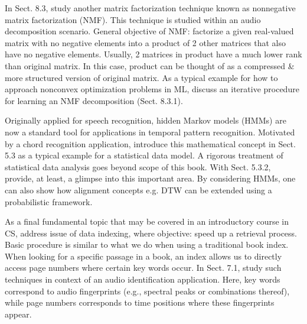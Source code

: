 \documentclass{article}
\begin{document}
\begin{itemize}
\begin{itemize}
		In Sect. 8.3, study another matrix factorization technique known as nonnegative matrix factorization (NMF). This technique is studied within an audio decomposition scenario. General objective of NMF: factorize a given real-valued matrix with no negative elements into a product of 2 other matrices that also have no negative elements. Usually, 2 matrices in product have a much lower rank than original matrix. In this case, product can be thought of as a compressed \& more structured version of original matrix. As a typical example for how to approach nonconvex optimization problems in ML, discuss an iterative procedure for learning an NMF decomposition (Sect. 8.3.1).
		
		Originally applied for speech recognition, hidden Markov models (HMMs) are now a standard tool for applications in temporal pattern recognition. Motivated by a chord recognition application, introduce this mathematical concept in Sect. 5.3 as a typical example for a statistical data model. A rigorous treatment of statistical data analysis goes beyond scope of this book. With Sect. 5.3.2, provide, at least, a glimpse into this important area. By considering HMMs, one can also show how alignment concepts e.g. DTW can be extended using a probabilistic framework.
		
		As a final fundamental topic that may be covered in an introductory course in CS, address issue of data indexing, where objective: speed up a retrieval process. Basic procedure is similar to what we do when using a traditional book index. When looking for a specific passage in a book, an index allows us to directly access page numbers where certain key words occur. In Sect. 7.1, study such techniques in context of an audio identification application. Here, key words correspond to audio fingerprints (e.g., spectral peaks or combinations thereof), while page numbers corresponds to time positions where these fingerprints appear.
		

\end{itemize}
\end{itemize}
\end{document}

